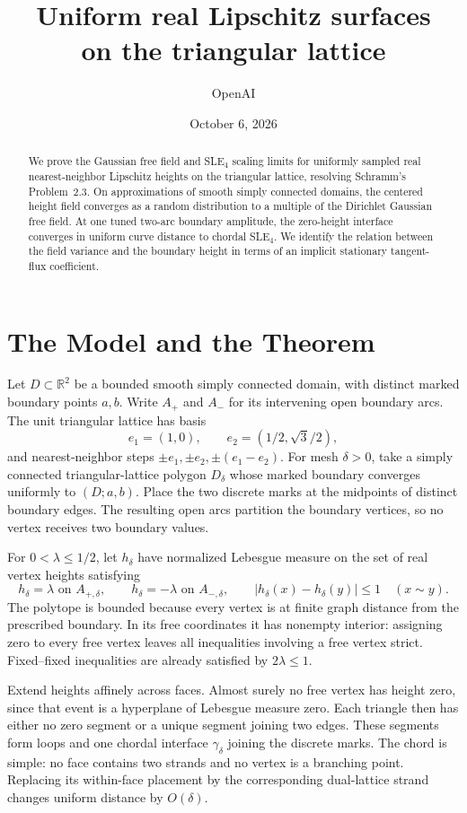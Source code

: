 \documentclass[11pt]{article}
\title{Uniform real Lipschitz surfaces\\on the triangular lattice}
\author{OpenAI}
\date{October 6, 2026}
\theoremstyle{definition}
\theoremstyle{remark}
\newcommand{\R}{\mathbb R}
\numberwithin{equation}{section}
\begin{document}
\maketitle
\begin{abstract}
We prove the Gaussian free field and SLE$_4$ scaling limits for uniformly
sampled real nearest-neighbor Lipschitz heights on the triangular lattice,
resolving Schramm's Problem~2.3. On approximations of smooth simply connected
domains, the centered height field converges as a random distribution to a
multiple of the Dirichlet Gaussian free field. At one tuned two-arc boundary
amplitude, the zero-height interface converges in uniform curve distance to
chordal SLE$_4$. We identify the relation between the field variance and the
boundary height in terms of an implicit stationary tangent-flux coefficient.
\end{abstract}
\tableofcontents

\section{The Model and the Theorem}\label{sec:model}
Let $D\subset\R^2$ be a bounded smooth simply connected domain, with
distinct marked boundary points $a,b$. Write $A_+$ and $A_-$ for its
intervening open boundary arcs. The unit triangular lattice has basis
\[
 e_1=(1,0),\qquad e_2=(1/2,\sqrt3/2),
\]
and nearest-neighbor steps $\pm e_1,\pm e_2,\pm(e_1-e_2)$. For mesh
$\delta>0$, take a simply connected triangular-lattice polygon $D_\delta$
whose marked boundary converges uniformly to $(D;a,b)$. Place the two
discrete marks at the midpoints of distinct boundary edges. The resulting
open arcs partition the boundary vertices, so no vertex receives two
boundary values.

For $0<\lambda\le1/2$, let $h_\delta$ have normalized Lebesgue measure on
the set of real vertex heights satisfying
\begin{equation}\label{eq:model}
 h_\delta=\lambda\text{ on }A_{+,\delta},\qquad
 h_\delta=-\lambda\text{ on }A_{-,\delta},\qquad
 |h_\delta(x)-h_\delta(y)|\le1\quad(x\sim y).
\end{equation}
The polytope is bounded because every vertex is at finite graph distance
from the prescribed boundary. In its free coordinates it has nonempty
interior: assigning zero to every free vertex leaves all inequalities
involving a free vertex strict. Fixed--fixed inequalities are already
satisfied by $2\lambda\le1$.

Extend heights affinely across faces. Almost surely no free vertex has
height zero, since that event is a hyperplane of Lebesgue measure zero.
Each triangle then has either no zero segment or a unique segment joining
two edges. These segments form loops and one chordal interface
$\gamma_\delta$ joining the discrete marks. The chord is simple: no face
contains two strands and no vertex is a branching point. Replacing its
within-face placement by the corresponding dual-lattice strand changes
uniform distance by $O(\delta)$.
\end{document}
